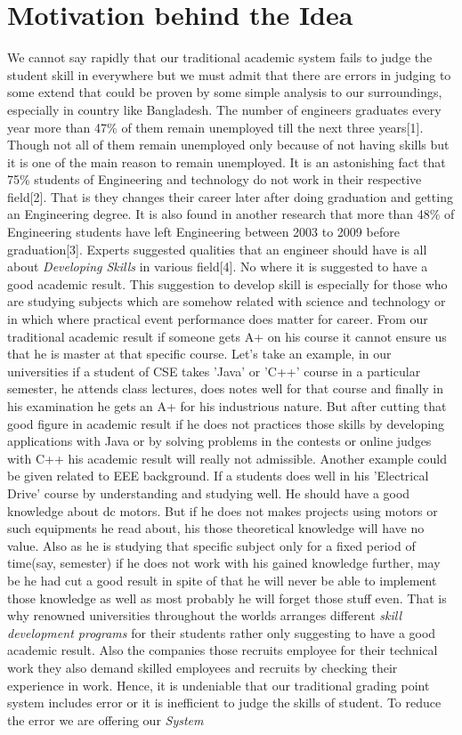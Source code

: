 \documentclass[conference]{IEEEtran}
\begin{document}
\section{Motivation behind the Idea}
We cannot say rapidly that our traditional academic system fails to judge the student skill in everywhere but we must admit that there are errors in judging to some extend that could be proven by some simple analysis to our surroundings, especially in country like Bangladesh. The number of engineers graduates every year more than 47\% of them remain unemployed till the next three years[1]. Though not all of them remain unemployed only because of not having skills but it is one of the main reason to remain unemployed. It is an astonishing fact that 75\% students of Engineering and technology do not work in their respective field[2]. That is they changes their career later after doing graduation and getting an Engineering degree. It is also found in another research that more than 48\% of Engineering students have left Engineering between 2003 to 2009 before graduation[3]. Experts suggested qualities that an engineer should have is all about \textit{Developing Skills} in various field[4]. No where it is suggested to have a good academic result. This suggestion to develop skill is especially for those who are studying subjects which are somehow related with science and technology or in which where practical event performance does matter for career. From our traditional academic result if someone gets A+ on his course it cannot ensure us that he is master at that specific course. Let's take an example, in our universities if a student of CSE takes 'Java' or 'C++' course in a particular semester, he attends class lectures, does notes well for that course and finally in his examination he gets an A+ for his industrious nature. But after cutting that good figure in academic result if he does not practices those skills by developing applications with Java or by solving problems in the contests or online judges with C++ his academic result will really not admissible. Another example could be given related to EEE background. If a students does well in his 'Electrical Drive' course by understanding and studying well. He should have a good knowledge about dc motors. But if he does not makes projects using motors or such equipments he read about, his those theoretical knowledge will have no value. Also as he is studying that specific subject only for a fixed period of time(say, semester) if he does not work with his gained knowledge further, may be he had cut a good result in spite of that he will never be able to implement those knowledge as well as most probably he will forget those stuff even. That is why renowned universities throughout the worlds arranges different \textit{skill development programs} for their students rather only suggesting to have a good academic result. Also the companies those recruits employee for their technical work they also demand skilled employees and recruits by checking their experience in work. Hence, it is undeniable that our traditional grading point system includes error or it is inefficient to judge the skills of student. To reduce the error we are offering our \textit{System} 
\end{document}
